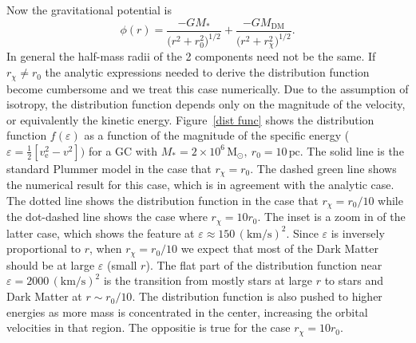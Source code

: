 \documentclass[aps,floatfix,prd,showpacs]{revtex4}
\newcommand{\vesc}{v_{\text{e}}}
\newcommand{\rx}{r_\chi}
\newcommand{\MDM}{M_{\mathrm{DM}}}
\newcommand{\Msun}{\textrm{M}_\odot}
\newcommand{\pc}{\textrm{pc}}
\newcommand{\km}{\textrm{km}}
\newcommand{\s}{\textrm{s}}
\begin{document}
Now the gravitational potential is
%
\begin{equation} 
\phi(r) = \frac{-GM_*}{\Big(r^2+r_0^2\Big)^{1/2}} + \frac{-G\MDM}{\Big(r^2+\rx^2\Big)^{1/2}}.
\end{equation}
%
%
In general the half-mass radii of the 2 components need not be the same. If $\rx \neq r_0$ the analytic expressions needed to derive the distribution function become cumbersome and we treat this case numerically. Due to the assumption of isotropy, the distribution function depends only on the magnitude of the velocity, or equivalently the kinetic energy.  Figure~\ref{dist func} shows the distribution function $f(\varepsilon)$ as a function of the magnitude of the specific energy \big($\varepsilon = \frac{1}{2}[\vesc^2-v^2]\big)$ for a GC with $M_*=2\times10^6\, \Msun,\ r_0=10\, \pc$. The solid line is the standard Plummer model in the case that $\rx = r_0$. The dashed green line shows the numerical result for this case, which is in agreement with the analytic case. The dotted line shows the distribution function in the case that $\rx = r_0/10$ while the dot-dashed line shows the case where $\rx = 10r_0$. The inset is a zoom in of the latter case, which shows the feature at $\varepsilon \approx 150\, (\km/\s)^2$.  Since $\varepsilon$ is inversely proportional to $r$, when $\rx = r_0/10$ we expect that most of the Dark Matter should be at large $\varepsilon$ (small $r$).  The flat part of the distribution function near $\varepsilon = 2000\, (\km/\s)^2$ is the transition from mostly stars at large $r$ to stars and Dark Matter at $r \sim r_0/10$.  The distribution function is also pushed to higher energies as more mass is concentrated in the center, increasing the orbital velocities in that region.  The oppositie is true for the case $\rx = 10r_0$.  
\end{document}
